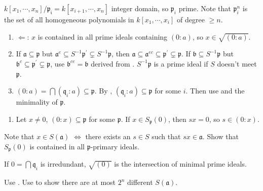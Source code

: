 \begin{exercise}\label{ex4.8}
	$k\left[x_1,\cdots,x_n\right]/\mathfrak{p_i}=k\left[x_{i+1},\cdots,x_n\right]$ integer domain, so $\mathfrak{p}_i$ prime. Note that $\mathfrak{p}_i^n$ is the set of all homogeneous polynomials in $k\left[x_1,\cdots,x_i\right]$ of degree $\geqslant n$.
\end{exercise}

\begin{exercise}\label{ex4.9}
	\begin{enumerate}[label=(\roman*),ref=\theexercise(\roman*)]
		\item $\Leftarrow$: $x$ is contained in all prime ideals containing $(0:a)$, so $x\in\sqrt{(0:a)}$.
		\item If $\mathfrak{a}\subseteq\mathfrak{p}$ but $\mathfrak{a}^e\subseteq S^{-1}\mathfrak{p}^\prime\subsetneq S^{-1}\mathfrak{p}$, then $\mathfrak{a}\subseteq\mathfrak{a}^{ec}\subseteq\mathfrak{p}^\prime\subsetneq\mathfrak{p}$. If $\mathfrak{b}\subseteq S^{-1}\mathfrak{p}$ but $\mathfrak{b}^c\subseteq\mathfrak{p}^\prime\subsetneq\mathfrak{p}$, use $\mathfrak{b}^{ce}=\mathfrak{b}$ derived from . $S^{-1}\mathfrak{p}$ is a prime ideal if $S$ doesn't meet $\mathfrak{p}$.
		\item $(0:a)=\bigcap\left(\mathfrak{q}_i:a\right)\subseteq\mathfrak{p}$. By , $\left(\mathfrak{q}_i:a\right)\subseteq\mathfrak{p}$ for some $i$. Then use  and the minimality of $\mathfrak{p}$.
	\end{enumerate}
\end{exercise}

\begin{exercise}\label{ex4.10}
	\begin{enumerate}
		\item[(iv)] Let $x\neq0$, $(0:x)\subseteq\mathfrak{p}$ for some $\mathfrak{p}$. If $x\in S_\mathfrak{p}(0)$, then $sx=0$, so $s\in(0:x)$.
	\end{enumerate}
\end{exercise}

\begin{exercise}\label{ex4.11}
	Note that $x\in S(\mathfrak{a})$ $\Leftrightarrow$ there exists an $s\in S$ such that $sx\in\mathfrak{a}$. Show that $S_\mathfrak{p}(0)$ is contained in all $\mathfrak{p}$-primary ideals.\par
	If $0=\bigcap\mathfrak{q}_i$ is irredundant, $\sqrt{(0)}$ is the intersection of minimal prime ideals.
\end{exercise}

\begin{exercise}\label{ex4.12}
	Use . Use  to show there are at most $2^n$ different $S(\mathfrak{a})$.
\end{exercise}
